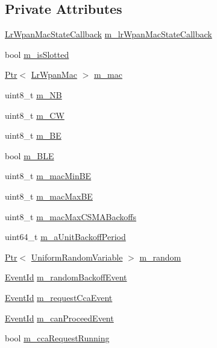 \subsection*{Private Attributes}
\begin{DoxyCompactItemize}
\item 
\hyperlink{group__lr-wpan_ga592f91469c801150297e7f1ac939b7ff}{Lr\+Wpan\+Mac\+State\+Callback} \hyperlink{classns3_1_1LrWpanCsmaCa_a5204cf0e1f945663d73892148abcbfc0}{m\+\_\+lr\+Wpan\+Mac\+State\+Callback}
\item 
bool \hyperlink{classns3_1_1LrWpanCsmaCa_a2a0bc6d2b32686d4f5aaf10c37813340}{m\+\_\+is\+Slotted}
\item 
\hyperlink{classns3_1_1Ptr}{Ptr}$<$ \hyperlink{classns3_1_1LrWpanMac}{Lr\+Wpan\+Mac} $>$ \hyperlink{classns3_1_1LrWpanCsmaCa_a15c5b0c3e10e4e3ad81293ee5916d1a6}{m\+\_\+mac}
\item 
uint8\+\_\+t \hyperlink{classns3_1_1LrWpanCsmaCa_ae6fd2d3aa6c2f6ec043d9c6821932603}{m\+\_\+\+NB}
\item 
uint8\+\_\+t \hyperlink{classns3_1_1LrWpanCsmaCa_a8d023ec83ebdeafe0a89602b8185e357}{m\+\_\+\+CW}
\item 
uint8\+\_\+t \hyperlink{classns3_1_1LrWpanCsmaCa_a2d88adfd84e36bd42136e97adadb7f9d}{m\+\_\+\+BE}
\item 
bool \hyperlink{classns3_1_1LrWpanCsmaCa_a679ee6d56f843070ecbe43be539cbd72}{m\+\_\+\+B\+LE}
\item 
uint8\+\_\+t \hyperlink{classns3_1_1LrWpanCsmaCa_a8e4fd67213592e79eda2550a1a03bf0c}{m\+\_\+mac\+Min\+BE}
\item 
uint8\+\_\+t \hyperlink{classns3_1_1LrWpanCsmaCa_a8597381e64d77767d3100899122c8ddc}{m\+\_\+mac\+Max\+BE}
\item 
uint8\+\_\+t \hyperlink{classns3_1_1LrWpanCsmaCa_afcd3646d791f66b115235dd662494ff3}{m\+\_\+mac\+Max\+C\+S\+M\+A\+Backoffs}
\item 
uint64\+\_\+t \hyperlink{classns3_1_1LrWpanCsmaCa_a0d93fb2ee7baf142892a71cfc068fd6c}{m\+\_\+a\+Unit\+Backoff\+Period}
\item 
\hyperlink{classns3_1_1Ptr}{Ptr}$<$ \hyperlink{classns3_1_1UniformRandomVariable}{Uniform\+Random\+Variable} $>$ \hyperlink{classns3_1_1LrWpanCsmaCa_aeb5ed4af956db040c190aca3416b11ba}{m\+\_\+random}
\item 
\hyperlink{classns3_1_1EventId}{Event\+Id} \hyperlink{classns3_1_1LrWpanCsmaCa_a426a65b1bf9433af0e88d7dd4b4b8e10}{m\+\_\+random\+Backoff\+Event}
\item 
\hyperlink{classns3_1_1EventId}{Event\+Id} \hyperlink{classns3_1_1LrWpanCsmaCa_a6a215728f302ffbcfe97f8d560f37780}{m\+\_\+request\+Cca\+Event}
\item 
\hyperlink{classns3_1_1EventId}{Event\+Id} \hyperlink{classns3_1_1LrWpanCsmaCa_a3e5ddf3c4614f1046d0e0cee1ecaa6ae}{m\+\_\+can\+Proceed\+Event}
\item 
bool \hyperlink{classns3_1_1LrWpanCsmaCa_ac340966d433ad1f4e8e47a4fea322b4e}{m\+\_\+cca\+Request\+Running}
\end{DoxyCompactItemize}
